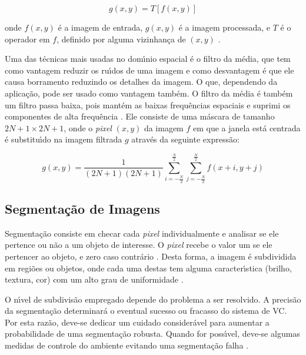 \begin{equation}
\label{EQU:DOMINESPAC}
g(x,y) = T[f(x,y)]
\end{equation}

onde $f(x,y)$ \'{e} a imagem de entrada, $g(x,y)$ \'{e} a imagem processada, e $T$ \'{e} o operador em $f$, definido por alguma vizinhan\c{c}a de $(x,y)$ \cite{GONZALEZ:2007}\cite{PITAS:2000}.

Uma das t\'{e}cnicas mais usadas no dom\'{\i}nio espacial \'{e} o filtro da m\'{e}dia, que tem como vantagem reduzir os ru\'{\i}dos de uma imagem e como desvantagem \'{e} que ele causa borramento reduzindo os detalhes da imagem. O que, dependendo da aplica\c{c}\~{a}o, pode ser usado como vantagem tamb\'{e}m. O filtro da m\'{e}dia \'{e} tamb\'{e}m um filtro passa baixa, pois mant\'{e}m as baixas frequ\^{e}ncias espaciais e suprimi os componentes de alta frequ\^{e}ncia \cite{NIXON:2002}. Ele consiste de uma m\'{a}scara de tamanho $2N + 1 \times 2N + 1$, onde o \emph{pixel} $(x,y)$ da imagem $f$ em que a janela est\'{a} centrada \'{e} substitu\'{\i}do na imagem filtrada $g$ atrav\'{e}s da seguinte express\~{a}o:

\begin{equation}
\label{EQU:FILTMED}
g(x,y) = \frac{1}{(2N + 1)(2N + 1)}\sum\limits_{i=-\frac{N}{2}}^{\frac{N}{2}}\sum\limits_{j=-\frac{N}{2}}^{\frac{N}{2}} f(x + i, y + j)
\end{equation}

\subsection{Segmenta\c{c}\~{a}o de Imagens}

Segmenta\c{c}\~{a}o consiste em checar cada \emph{pixel} individualmente e analisar se ele pertence ou n\~{a}o a um objeto de interesse. O \emph{pixel} recebe o valor um se ele pertencer ao objeto, e zero caso contr\'{a}rio \cite{JAHNE:2005}. Desta forma, a imagem \'{e} subdividida em regi\~{o}es ou objetos, onde cada uma destas tem alguma caracter\'{\i}stica (brilho, textura, cor) com um alto grau de uniformidade \cite{DAVIES:2004}.

O n\'{\i}vel de subdivis\~{a}o empregado depende do problema a ser resolvido. A precis\~{a}o da segmenta\c{c}\~{a}o determinar\'{a} o eventual sucesso ou fracasso do sistema de \ac{VC}. Por esta raz\~{a}o, deve-se dedicar um cuidado consider\'{a}vel para aumentar a probabilidade de uma segmenta\c{c}\~{a}o robusta. Quando for poss\'{\i}vel, deve-se algumas medidas de controle do ambiente evitando uma segmenta\c{c}\~{a}o falha \cite{GONZALEZ:2007}.

